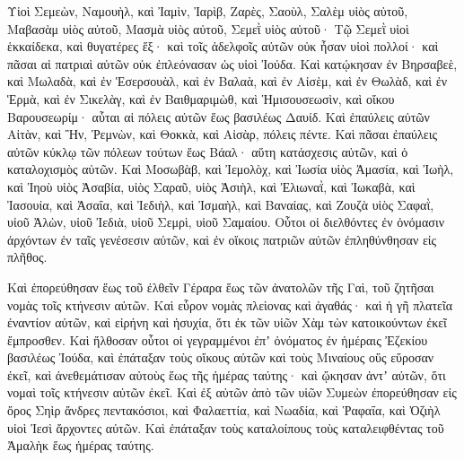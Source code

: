 {\par }{\PP {}Υἱοὶ Σεμεὼν, Ναμουὴλ, καὶ Ἰαμὶν, Ἰαρὶβ, Ζαρὲς, Σαοὺλ,
Σαλὲμ υἱὸς αὐτοῦ, Μαβασὰμ υἱὸς αὐτοῦ, Μασμὰ υἱὸς αὐτοῦ,
Σεμεῒ υἱὸς αὐτοῦ·
Τῷ Σεμεῒ υἱοὶ ἑκκαίδεκα, καὶ θυγατέρες ἕξ· καὶ τοῖς ἀδελφοῖς αὐτῶν οὐκ ἦσαν υἱοὶ πολλοί· καὶ πᾶσαι αἱ πατριαὶ αὐτῶν οὐκ ἐπλεόνασαν ὡς υἱοὶ Ἰούδα.
Καὶ κατῴκησαν ἐν Βηρσαβεὲ, καὶ Μωλαδὰ, καὶ ἐν Ἑσερσουὰλ,
καὶ ἐν Βαλαὰ, καὶ ἐν Αἰσὲμ, καὶ ἐν Θωλὰδ,
καὶ ἐν Ἑρμὰ, καὶ ἐν Σικελὰγ,
καὶ ἐν Βαιθμαριμὼθ, καὶ Ἡμισουσεωσὶν, καὶ οἴκου Βαρουσεωρίμ· αὗται αἱ πόλεις αὐτῶν ἕως βασιλέως Δαυίδ.
Καὶ ἐπαύλεις αὐτῶν Αἰτὰν, καὶ Ἢν, Ῥεμνὼν, καὶ Θοκκὰ, καὶ Αἰσὰρ, πόλεις πέντε.
Καὶ πᾶσαι ἐπαύλεις αὐτῶν κύκλῳ τῶν πόλεων τούτων ἕως Βάαλ· αὕτη κατάσχεσις αὐτῶν, καὶ ὁ καταλοχισμὸς αὐτῶν.
Καὶ Μοσωβὰβ, καὶ Ἰεμολὸχ, καὶ Ἰωσία υἱὸς Ἀμασία,
καὶ Ἰωὴλ, καὶ Ἰηοὺ υἱὸς Ἀσαβία, υἱὸς Σαραῦ, υἱὸς Ἀσιὴλ,
καὶ Ἐλιωναῒ, καὶ Ἰωκαβὰ, καὶ Ἰασουία, καὶ Ἀσαΐα, καὶ Ἰεδιὴλ, καὶ Ἰσμαὴλ, καὶ Βαναίας, καὶ Ζουζὰ υἱὸς Σαφαῒ,
υἱοῦ Ἀλὼν, υἱοῦ Ἰεδιὰ, υἱοῦ Σεμρὶ, υἱοῦ Σαμαίου.
Οὗτοι οἱ διελθόντες ἐν ὀνόμασιν ἀρχόντων ἐν ταῖς γενέσεσιν αὐτῶν, καὶ ἐν οἴκοις πατριῶν αὐτῶν ἐπληθύνθησαν εἰς πλῆθος.
\par }{\PP {}Καὶ ἐπορεύθησαν ἕως τοῦ ἐλθεῖν Γέραρα ἕως τῶν ἀνατολῶν τῆς Γαὶ, τοῦ ζητῆσαι νομὰς τοῖς κτήνεσιν αὐτῶν.
Καὶ εὗρον νομὰς πλεὶονας καὶ ἀγαθάς· καὶ ἡ γῆ πλατεῖα ἐναντίον αὐτῶν, καὶ εἰρήνη καὶ ἡσυχία, ὅτι ἐκ τῶν υἱῶν Χὰμ τὼν κατοικούντων ἐκεῖ ἔμπροσθεν.
Καὶ ἤλθοσαν οὗτοι οἱ γεγραμμένοι ἐπʼ ὀνόματος ἐν ἡμέραις Ἐζεκίου βασιλέως Ἰούδα, καὶ ἐπάταξαν τοὺς οἴκους αὐτῶν καὶ τοὺς Μιναίους οὕς εὕροσαν ἐκεῖ, καὶ ἀνεθεμάτισαν αὐτοὺς ἕως τῆς ἡμέρας ταύτης· καὶ ᾤκησαν ἀντʼ αὐτῶν, ὅτι νομαὶ τοῖς κτήνεσιν αὐτῶν ἐκεῖ.
Καὶ ἐξ αὐτῶν ἀπὸ τῶν υἱῶν Συμεὼν ἐπορεύθησαν εἰς ὄρος Σηὶρ ἄνδρες πεντακόσιοι, καὶ Φαλαεττία, καὶ Νωαδία, καὶ Ῥαφαΐα, καὶ Ὀζιὴλ υἱοὶ Ἰεσὶ ἄρχοντες αὐτῶν.
Καὶ ἐπάταξαν τοὺς καταλοίπους τοὺς καταλειφθέντας τοῦ Ἀμαλὴκ ἕως ἡμέρας ταύτης.

}
